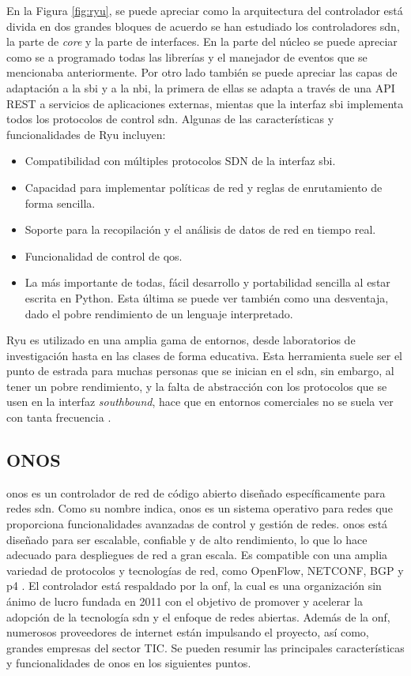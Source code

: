 En la Figura \ref*{fig:ryu}, se puede apreciar como la arquitectura del controlador está divida en dos grandes bloques de acuerdo se han estudiado los controladores \gls{sdn}, la parte de \textit{core} y la parte de interfaces. En la parte del núcleo se puede apreciar como se a programado todas las librerías y el manejador de eventos que se mencionaba anteriormente. Por otro lado también se puede apreciar las capas de adaptación a la \gls{sbi} y a la \gls{nbi}, la primera de ellas se adapta a través de una API REST a servicios de aplicaciones externas, mientas que la interfaz \gls{sbi} implementa todos los protocolos de control \gls{sdn}. Algunas de las características y funcionalidades de Ryu incluyen:

\begin{itemize}
    \item Compatibilidad con múltiples protocolos SDN de la interfaz \gls{sbi}.
    \item Capacidad para implementar políticas de red y reglas de enrutamiento de forma sencilla.
    \item Soporte para la recopilación y el análisis de datos de red en tiempo real.
    \item Funcionalidad de control de \gls{qos}.
    \item La más importante de todas, fácil desarrollo y portabilidad sencilla al estar escrita en Python. Esta última se puede ver también como una desventaja, dado el pobre rendimiento de un lenguaje interpretado.
\end{itemize}

Ryu es utilizado en una amplia gama de entornos, desde laboratorios de investigación hasta en las clases de forma educativa. Esta herramienta suele ser el punto de estrada para muchas personas que se inician en el \gls{sdn}, sin embargo, al tener un pobre rendimiento, y la falta de abstracción con los protocolos que se usen en la interfaz \textit{southbound}, hace que en entornos comerciales no se suela ver con tanta frecuencia \cite{tomonori2013introduction}.

\subsection{ONOS}
\label{subsec:ONOS}

\gls{onos} es un controlador de red de código abierto diseñado específicamente para redes \gls{sdn}. Como su nombre indica, \gls{onos} es un sistema operativo para redes que proporciona funcionalidades avanzadas de control y gestión de redes. \gls{onos} está diseñado para ser escalable, confiable y de alto rendimiento, lo que lo hace adecuado para despliegues de red a gran escala. Es compatible con una amplia variedad de protocolos y tecnologías de red, como OpenFlow, NETCONF, BGP y \gls{p4} \cite{onos3}. El controlador está respaldado por la \gls{onf}, la cual es una organización sin ánimo de lucro fundada en 2011 con el objetivo de promover y acelerar la adopción de la tecnología \gls{sdn} y el enfoque de redes abiertas. Además de la \gls{onf}, numerosos proveedores de internet están impulsando el proyecto, así como, grandes empresas del sector TIC. Se pueden resumir las principales características y funcionalidades de \gls{onos} en los siguientes puntos.

